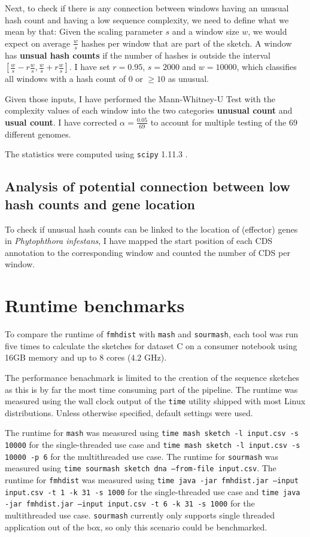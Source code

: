 Next, to check if there is any connection between windows having an unusual hash
count and having a low sequence complexity, we need to define what we mean by
that: Given the scaling parameter $s$ and a window size $w$, we would expect on
average $\frac{w}{s}$ hashes per window that are part of the sketch. A window
has \textbf{unsual hash counts} if the number of hashes is outside the interval
$[\frac{w}{s} - r \frac{w}{s}, \frac{w}{s} + r \frac{w}{s}]$. I have set
$r=0.95$, $s=2000$ and $w=10000$, which classifies all windows with a hash count
of $0$ or $\geq 10$ as unusual.

Given those inputs, I have performed the Mann-Whitney-U Test
\cite{mannTestWhetherOne1947,wilcoxonIndividualComparisonsRanking1945} with the
complexity values of each window into the two categories \textbf{unusual count}
and \textbf{usual count}. I have corrected $\alpha = \frac{0.05}{69}$ to account
for multiple testing of the 69 different genomes.

The statistics were computed using \texttt{scipy} 1.11.3
\cite{virtanenSciPyFundamentalAlgorithms2020}.

\subsection*{Analysis of potential connection between low hash counts and gene location}
To check if unusual hash counts can be linked to the location of (effector)
genes in \textit{Phytophthora infestans}, I have mapped the start position of
each CDS annotation to the corresponding window and counted the number of CDS
per window.

\section{Runtime benchmarks}
To compare the runtime of \texttt{fmhdist} with \texttt{mash} and
\texttt{sourmash}, each tool was run five times to calculate the sketches for
dataset C on a consumer notebook using 16GB memory and up to 8 cores ($4.2$
GHz).

The performance benachmark is limited to the creation of the sequence sketches
as this is by far the most time consuming part of the pipeline. The runtime was
measured using the wall clock output of the \texttt{time} utility shipped with
most Linux distributions. Unless otherwise specified, default settings were
used. 

The runtime for \texttt{mash} was measured using \texttt{time mash sketch -l
input.csv -s 10000} for the single-threaded use case and \texttt{time mash
sketch -l input.csv -s 10000 -p 6} for the multithreaded use case. The runtime
for \texttt{sourmash} was measured using \texttt{time sourmash sketch dna
--from-file input.csv}. The runtime for \texttt{fmhdist} was measured using
\texttt{time java -jar fmhdist.jar --input input.csv -t 1 -k 31 -s 1000} for the
single-threaded use case and \texttt{time java -jar fmhdist.jar --input
input.csv -t 6 -k 31 -s 1000} for the multithreaded use case. \texttt{sourmash}
currently only supports single threaded application out of the box, so only this
scenario could be benchmarked.
